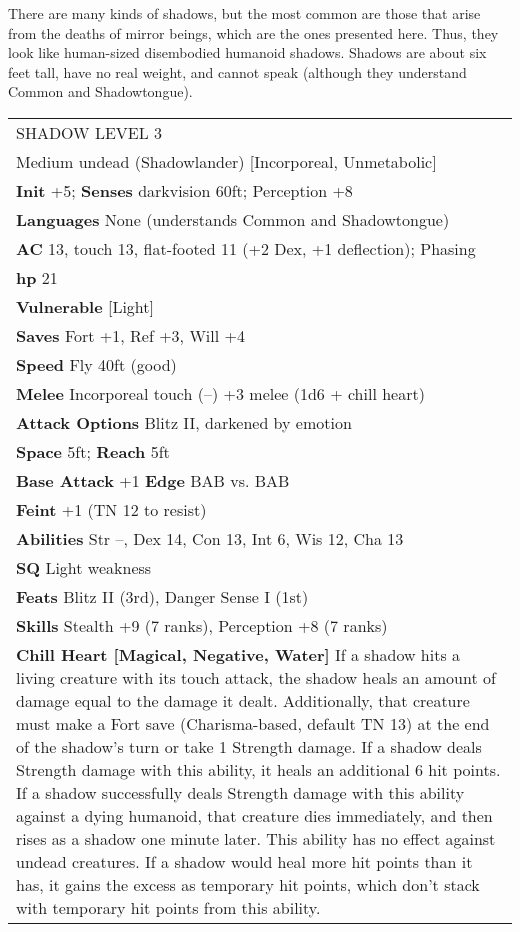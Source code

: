 \documentclass[10pt]{article}
\begin{document}
There are many kinds of shadows, but the most common are those that arise from the deaths of mirror beings, which are the ones presented here. Thus, they look like human-sized disembodied humanoid shadows. Shadows are about six feet tall, have no real weight, and cannot speak (although they understand Common and Shadowtongue).

\begin{longtabu} to 0.7\linewidth{X[l]}
\toprule
\rowfont{\bfseries}SHADOW \hfill LEVEL 3\\
Medium undead (Shadowlander) [Incorporeal, Unmetabolic]\\
{\bf Init} +5; {\bf Senses} darkvision 60ft; Perception +8\\
{\bf Languages} None (understands Common and Shadowtongue)\\
\midrule
{\bf AC} 13, touch 13, flat-footed 11 (+2 Dex, +1 deflection); Phasing\\
{\bf hp} 21\\
{\bf Vulnerable} [Light]\\
{\bf Saves} Fort +1, Ref +3, Will +4\\
\midrule
{\bf Speed} Fly 40ft (good)\\
{\bf Melee} Incorporeal touch (--) +3 melee (1d6 + chill heart)\\
{\bf Attack Options} Blitz II, darkened by emotion\\
{\bf Space} 5ft; {\bf Reach} 5ft\\
\midrule
{\bf Base Attack} +1 {\bf Edge} BAB vs. BAB\\
{\bf Feint} +1 (TN 12 to resist)\\
\midrule
{\bf Abilities} Str --, Dex 14, Con 13, Int 6, Wis 12, Cha 13\\
{\bf SQ} Light weakness\\
{\bf Feats} Blitz II (3rd), Danger Sense I (1st)\\
{\bf Skills} Stealth +9 (7 ranks), Perception +8 (7 ranks)\\
\midrule
{\bf Chill Heart [Magical, Negative, Water]} If a shadow hits a living creature with its touch attack, the shadow heals an amount of damage equal to the damage it dealt. Additionally, that creature must make a Fort save (Charisma-based, default TN 13) at the end of the shadow's turn or take 1 Strength damage. If a shadow deals Strength damage with this ability, it heals an additional 6 hit points. If a shadow successfully deals Strength damage with this ability against a dying humanoid, that creature dies immediately, and then rises as a shadow one minute later. This ability has no effect against undead creatures. If a shadow would heal more hit points than it has, it gains the excess as temporary hit points, which don't stack with temporary hit points from this ability.\\

\end{longtabu}
\end{document}
